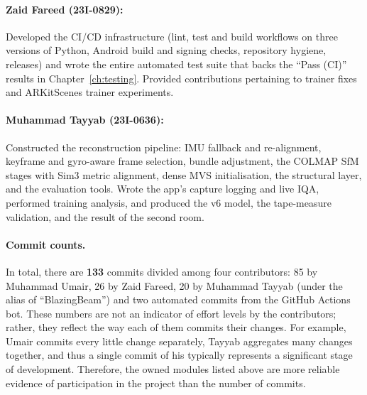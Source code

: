 \paragraph{Zaid Fareed (23I-0829):}
Developed the CI/CD infrastructure (lint, test and build workflows on three versions of Python, Android build and signing checks, repository hygiene, releases) and wrote the entire automated test suite that backs the ``Pass (CI)'' results in Chapter~\ref{ch:testing}. Provided contributions pertaining to trainer fixes and ARKitScenes trainer experiments.

\paragraph{Muhammad Tayyab (23I-0636):}
Constructed the reconstruction pipeline: IMU fallback and re-alignment, keyframe and gyro-aware frame selection, bundle adjustment, the COLMAP SfM stages with Sim3 metric alignment, dense MVS initialisation, the structural layer, and the evaluation tools. Wrote the app's capture logging and live IQA, performed training analysis, and produced the v6 model, the tape-measure validation, and the result of the second room.

\paragraph{Commit counts.}
In total, there are \textbf{133} commits divided among four contributors: 85 by Muhammad Umair, 26 by Zaid Fareed, 20 by Muhammad Tayyab (under the alias of ``BlazingBeam'') and two automated commits from the GitHub Actions bot. These numbers are not an indicator of effort levels by the contributors; rather, they reflect the way each of them commits their changes. For example, Umair commits every little change separately, Tayyab aggregates many changes together, and thus a single commit of his typically represents a significant stage of development. Therefore, the owned modules listed above are more reliable evidence of participation in the project than the number of commits.

